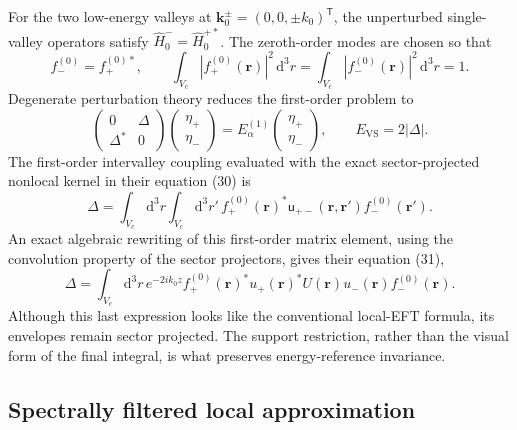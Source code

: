 For the two low-energy valleys at
$\mathbf k_0^{\pm}=(0,0,\pm k_0)^{\mathsf T}$, the unperturbed single-valley
operators satisfy $\hat H_0^{-}=\hat H_0^{+*}$. The zeroth-order modes are
chosen so that
\begin{equation}
  f_-^{(0)}=f_+^{(0)*},
  \qquad
  \int_{V_c}|f_+^{(0)}(\mathbf r)|^2\,\mathrm{d}^3r
  =
  \int_{V_c}|f_-^{(0)}(\mathbf r)|^2\,\mathrm{d}^3r
  =1.
  \label{eq:ermoneit-valley-mode-normalization}
\end{equation}
Degenerate perturbation theory reduces the first-order problem to
\begin{equation}
  \begin{pmatrix}0&\Delta\\\Delta^{*}&0\end{pmatrix}
  \begin{pmatrix}\eta_+\\\eta_-\end{pmatrix}
  =
  E_\alpha^{(1)}
  \begin{pmatrix}\eta_+\\\eta_-\end{pmatrix},
  \qquad
  E_{\mathrm{VS}}=2|\Delta|.
  \label{eq:ermoneit-valley-splitting-matrix}
\end{equation}
The first-order intervalley coupling evaluated with the exact sector-projected
nonlocal kernel in their equation (30) is
\begin{equation}
  \Delta
  =
  \int_{V_c}\!\mathrm{d}^3r
  \int_{V_c}\!\mathrm{d}^3r'\,
  f_{+}^{(0)}(\mathbf r)^{*}
  \mathsf u_{+-}(\mathbf r,\mathbf r')
  f_{-}^{(0)}(\mathbf r').
  \label{eq:ermoneit-nonlocal-intervalley-coupling}
\end{equation}
An exact algebraic rewriting of this first-order matrix element, using the
convolution property of the sector projectors, gives their equation (31),
\begin{equation}
  \Delta
  =
  \int_{V_c}\!\mathrm{d}^3r\,
  e^{-2ik_0z}
  f_{+}^{(0)}(\mathbf r)^{*}
  u_{+}(\mathbf r)^{*}U(\mathbf r)
  u_{-}(\mathbf r)f_{-}^{(0)}(\mathbf r).
  \label{eq:ermoneit-local-looking-exact-coupling}
\end{equation}
Although this last expression looks like the conventional local-EFT formula,
its envelopes remain sector projected. The support restriction, rather than the
visual form of the final integral, is what preserves energy-reference
invariance.

\subsection{Spectrally filtered local approximation}

